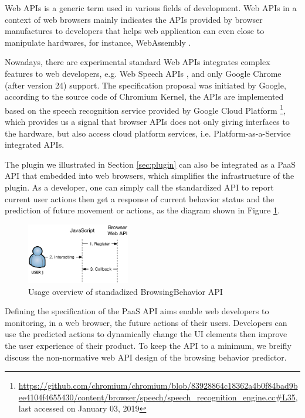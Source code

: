 Web APIs is a generic term used in various fields of development.
Web APIs in a context of web browsers mainly indicates the APIs provided
by browser manufactures to developers that helps web application can even close
to manipulate hardwares, for instance, WebAssembly \cite{w3c2018ws}.

Nowadays, there are experimental standard Web APIs integrates complex features to 
web developers, e.g. Web Speech APIs \cite{mozilla2019speech}, and 
only Google Chrome (after version 24) support. 
The specification proposal was initiated by Google, according to 
the source code of Chromium Kernel, the APIs are implemented based on 
the speech recognition service provided 
by Google Cloud Platform 
\footnote{\url{https://github.com/chromium/chromium/blob/83928864c18362a4b0f84bad9bee4104f4655430/content/browser/speech/speech\_recognition\_engine.cc\#L35}, last accessed on January 03, 2019},
which provides us a signal that browser APIs does not only giving interfaces to
the hardware, but also access cloud platform services, i.e. Platform-as-a-Service integrated 
APIs.

The plugin we illustrated in Section \ref{sec:plugin} can also be integrated as a PaaS API
that embedded into web browsers, which simplifies the infrastructure of the plugin. 
As a developer, one can simply call the standardized API to report current user actions
then get a response of current behavior status and the prediction of future movement or 
actions, as the diagram shown in Figure \ref{fig:webapi}.

\begin{figure}[H]
    \centering
    \includegraphics[width=0.4\textwidth]{figures/webapi}
    \caption{Usage overview of standadized BrowsingBehavior API}
    \label{fig:webapi}
\end{figure}

Defining the specification of the PaaS API aims enable web developers to
monitoring, in a web browser, the future actions of their users.
Developers can use the predicted actions to dynamically change the UI elements then improve
the user experience of their product. To keep the API to a minimum, we breifly discuss the
non-normative web API design of the browsing behavior predictor.

